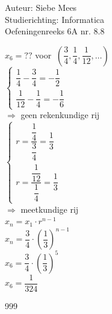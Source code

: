 \documentclass[a4paper]{article}
\begin{document}
  
\noindent \large Auteur: Siebe Mees \\
\noindent \large Studierichting: Informatica\\
\noindent \large Oefeningenreeks 6A nr. 8.8\\

\medskip

\normalsize

$x_6 = ?? $ voor $\ \left( \dfrac{3}{4}, \dfrac{1}{4}, \dfrac{1}{12}, \ldots \right)$\\

$ \left \{
\begin{array}{l}
\dfrac{1}{4} - \dfrac{3}{4} = -\dfrac{1}{2}\\
\dfrac{1}{12} - \dfrac{1}{4} = -\dfrac{1}{6}
\end{array}
\right .$\\

$\Rightarrow $ geen rekenkundige rij \\

$ \left \{
\begin{array}{l}
r = \dfrac{\dfrac{1}{4}}{\dfrac{3}{4}} = \dfrac{1}{3}\\
r = \dfrac{\dfrac{1}{12}}{\dfrac{1}{4}} = \dfrac{1}{3}
\end{array}
\right .$\\

$\Rightarrow $ meetkundige rij \\

$x_n = x_1 \cdot r^{n-1}$\\

$x_n = \dfrac{3}{4} \cdot \left(\dfrac{1}{3}\right)^{n-1}$\\

$x_6 = \dfrac{3}{4} \cdot \left(\dfrac{1}{3}\right)^5$\\

$x_6 = \dfrac{1}{324}$\\

\begin{thebibliography}{999}
\end{thebibliography}
\end{document}
